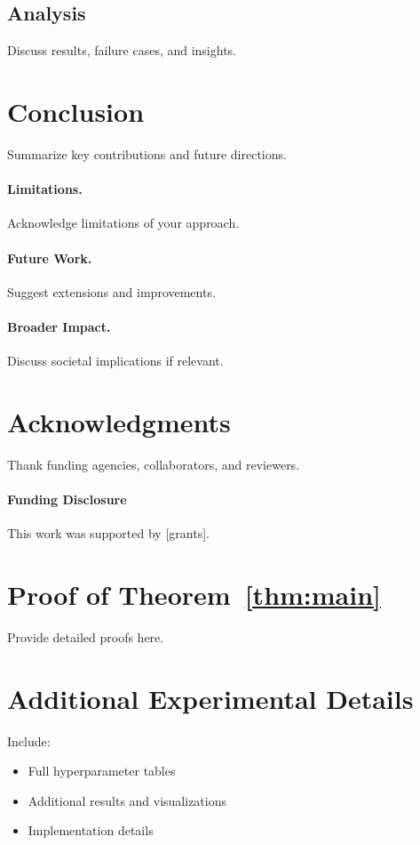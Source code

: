 \documentclass{article}
\begin{document}
\subsection{Analysis}

Discuss results, failure cases, and insights.

\section{Conclusion}
\label{sec:conclusion}

Summarize key contributions and future directions.

\paragraph{Limitations.} Acknowledge limitations of your approach.

\paragraph{Future Work.} Suggest extensions and improvements.

\paragraph{Broader Impact.} Discuss societal implications if relevant.

\section*{Acknowledgments}

Thank funding agencies, collaborators, and reviewers.

\paragraph{Funding Disclosure} This work was supported by [grants].




\appendix

\section{Proof of Theorem~\ref{thm:main}}
\label{app:proof}

Provide detailed proofs here.

\section{Additional Experimental Details}
\label{app:experiments}

Include:
\begin{itemize}
    \item Full hyperparameter tables
    \item Additional results and visualizations
    \item Implementation details
\end{itemize}
\end{document}
